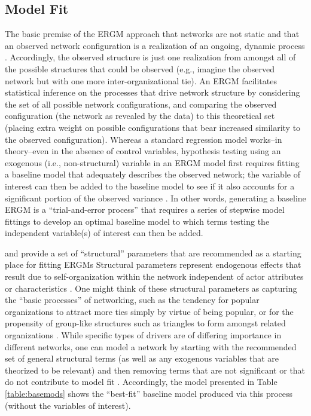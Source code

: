 \documentclass[12pt,a4paper,titlepage]{article}
\begin{document}
\subsection{Model Fit}

The basic premise of the ERGM approach that networks are not static and that an observed network configuration is a realization of an ongoing, dynamic process \parencite{lusher2013-a}. Accordingly, the observed structure is just one realization from amongst all of the possible structures that could be observed (e.g., imagine the observed network but with one more inter-organizational tie). An ERGM facilitates statistical inference on the processes that drive network structure by considering the set of all possible network configurations, and comparing the observed configuration (the network as revealed by the data) to this theoretical set (placing extra weight on possible configurations that bear increased similarity to the observed configuration). Whereas a standard regression model works--in theory--even in the absence of control variables, hypothesis testing using an exogenous (i.e., non-structural) variable in an ERGM model first requires fitting a baseline model that adequately describes the observed network; the variable of interest can then be added to the baseline model to see if it also accounts for a significant portion of the observed variance \parencite{kolaczyk2009,lusher2013-a}. In other words, generating a baseline ERGM is a “trial-and-error process” \parencite[184]{lusher2013-a} that requires a series of stepwise model fittings to develop an optimal baseline model to which terms testing the independent variable(s) of interest can then be added.

\textcite{snijders2006} and \textcite{lusher2013-a} provide a set of ``structural'' parameters that are recommended as a starting place for fitting ERGMs Structural parameters represent endogenous effects that result due to self-organization within the network independent of actor attributes or characteristics \parencite{lusher2013-a}. One might think of these structural parameters as capturing the “basic processes” of networking, such as the tendency for popular organizations to attract more ties simply by virtue of being popular, or for the propensity of group-like structures such as triangles to form amongst related organizations \parencite{lusher2013-a}. While specific types of drivers are of differing importance in different networks, one can model a network by starting with the recommended set of general structural terms (as well as any exogenous variables that are theorized to be relevant) and then removing terms that are not significant or that do not contribute to model fit \parencite{snijders2006}. Accordingly, the model presented in Table \ref{table:basemods} shows the “best-fit” baseline model produced via this process (without the variables of interest). 
\end{document}
